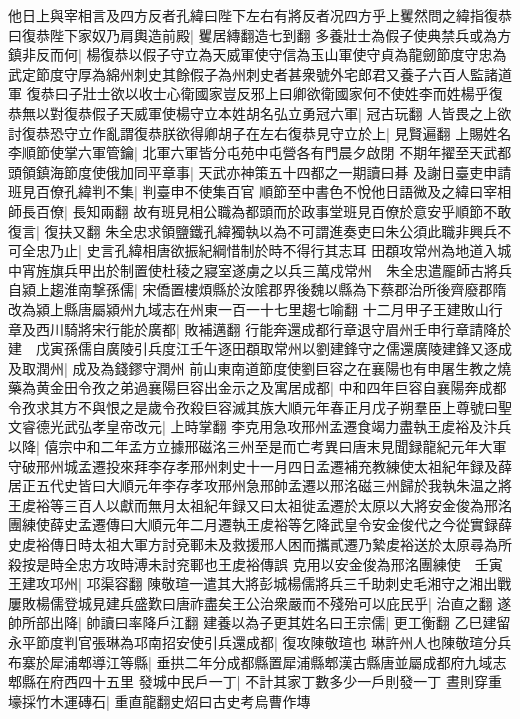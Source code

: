 他日上與宰相言及四方反者孔緯曰陛下左右有將反者况四方乎上矍然問之緯指復恭曰復恭陛下家奴乃肩輿造前殿|{
	矍居縳翻造七到翻}
多養壯士為假子使典禁兵或為方鎮非反而何|{
	楊復恭以假子守立為天威軍使守信為玉山軍使守貞為龍劒節度守忠為武定節度守厚為綿州刺史其餘假子為州刺史者甚衆號外宅郎君又養子六百人監諸道軍}
復恭曰子壯士欲以收士心衛國家豈反邪上曰卿欲衛國家何不使姓李而姓楊乎復恭無以對復恭假子天威軍使楊守立本姓胡名弘立勇冠六軍|{
	冠古玩翻}
人皆畏之上欲討復恭恐守立作亂謂復恭朕欲得卿胡子在左右復恭見守立於上|{
	見賢遍翻}
上賜姓名李順節使掌六軍管鑰|{
	北軍六軍皆分屯苑中屯營各有門晨夕啟閉}
不期年擢至天武都頭領鎮海節度使俄加同平章事|{
	天武亦神策五十四都之一期讀曰朞}
及謝日臺吏申請班見百僚孔緯判不集|{
	判臺申不使集百官}
順節至中書色不悅他日語微及之緯曰宰相師長百僚|{
	長知兩翻}
故有班見相公職為都頭而於政事堂班見百僚於意安乎順節不敢復言|{
	復扶又翻}
朱全忠求領鹽鐵孔緯獨執以為不可謂進奏吏曰朱公須此職非興兵不可全忠乃止|{
	史言孔緯相唐欲振紀綱惜制於時不得行其志耳}
田頵攻常州為地道入城中宵旌旗兵甲出於制置使杜稜之寢室遂虜之以兵三萬戍常州　朱全忠遣龎師古將兵自潁上趨淮南撃孫儒|{
	宋僑置樓煩縣於汝隂郡界後魏以縣為下蔡郡治所後齊廢郡隋改為潁上縣唐屬潁州九域志在州東一百一十七里趨七喻翻}
十二月甲子王建敗山行章及西川騎將宋行能於廣都|{
	敗補邁翻}
行能奔還成都行章退守眉州壬申行章請降於建　戊寅孫儒自廣陵引兵度江壬午逐田頵取常州以劉建鋒守之儒還廣陵建鋒又逐成及取潤州|{
	成及為錢鏐守潤州}
前山東南道節度使劉巨容之在襄陽也有申屠生教之燒藥為黄金田令孜之弟過襄陽巨容出金示之及寓居成都|{
	中和四年巨容自襄陽奔成都}
令孜求其方不與恨之是歲令孜殺巨容滅其族大順元年春正月戊子朔羣臣上尊號曰聖文睿德光武弘孝皇帝改元|{
	上時掌翻}
李克用急攻邢州孟遷食竭力盡執王䖍裕及汴兵以降|{
	僖宗中和二年孟方立據邢磁洺三州至是而亡考異曰唐末見聞録龍紀元年大軍守破邢州城孟遷投來拜李存孝邢州刺史十一月四日孟遷補充教練使太祖紀年録及薛居正五代史皆曰大順元年李存孝攻邢州急邢帥孟遷以邢洺磁三州歸於我執朱温之將王䖍裕等三百人以獻而無月太祖紀年録又曰太祖徙孟遷於太原以大將安金俊為邢洺團練使薛史孟遷傳曰大順元年二月遷執王䖍裕等乞降武皇令安金俊代之今從實録薛史䖍裕傳日時太祖大軍方討兗鄆未及救援邢人困而攜貳遷乃縶䖍裕送於太原尋為所殺按是時全忠方攻時溥未討兖鄆也王䖍裕傳誤}
克用以安金俊為邢洺團練使　壬寅王建攻邛州|{
	邛渠容翻}
陳敬瑄一遣其大將彭城楊儒將兵三千助刺史毛湘守之湘出戰屢敗楊儒登城見建兵盛歎曰唐祚盡矣王公治衆嚴而不殘殆可以庇民乎|{
	治直之翻}
遂帥所部出降|{
	帥讀曰率降戶江翻}
建養以為子更其姓名曰王宗儒|{
	更工衡翻}
乙巳建留永平節度判官張琳為邛南招安使引兵還成都|{
	復攻陳敬瑄也}
琳許州人也陳敬瑄分兵布寨於犀浦郫導江等縣|{
	垂拱二年分成都縣置犀浦縣郫漢古縣唐並屬成都府九域志郫縣在府西四十五里}
發城中民戶一丁|{
	不計其家丁數多少一戶則發一丁}
晝則穿重壕採竹木運磚石|{
	重直龍翻史炤曰古史考烏曹作塼}
